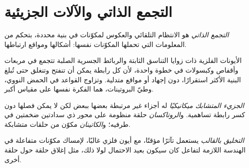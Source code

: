 \section{التجمع الذاتي والآلات الجزيئية}

\begin{definition}\label{def:b3:supramolecular:self-assembly}
\emph{التجمع الذاتي} هو الانتظام التلقائي والعكوس
لمكوّنات في بنية محددة، بتحكم من
المعلومات التي تحملها المكوّنات نفسها: أشكالها ومواقع
ارتباطها.
\end{definition}

الأيونات الفلزية ذات زوايا التناسق الثابتة والربائط الجسرية الصلبة تتجمع
في مربعات وأقفاص وكبسولات في خطوة واحدة، لأن كل رابطة يمكن أن تنفتح
وتنغلق حتى تُبلغ البنية الأكثر استقرارًا، دون إجهاد أو مواقع متدلية.
وتزاوج القواعد في الحمض النووي، وطيّ البروتينات، هما الفكرة نفسها
على مقياس أكبر.

\begin{definition}\label{def:b3:supramolecular:interlocked}
\emph{الجزيء المتشابك ميكانيكيًا}
له أجزاء غير مرتبطة بعضها ببعض لكن لا يمكن فصلها
دون كسر رابطة تساهمية. و\emph{الروتاكسان} حلقة
منظومة على محور ذي سدادتين ضخمتين في طرفيه؛ 
و\emph{الكاتينان} مكوّن من حلقات متشابكة.
\end{definition}

\begin{definition}\label{def:b3:supramolecular:template}
\emph{التخليق بالقالب} يستعمل تآثرًا
مؤقتًا، مع أيون فلزي غالبًا، لإمساك مكوّنات متفاعلة في
الهندسة اللازمة لتفاعل كان سيكون بعيد الاحتمال لولا ذلك، مثل
إغلاق حلقة حول حلقة أخرى.
\end{definition}

